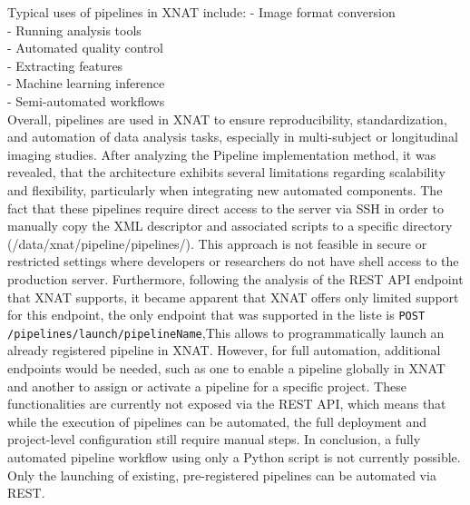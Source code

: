 Typical uses of pipelines in XNAT include:
- Image format conversion\\
- Running analysis tools\\
- Automated quality control\\
- Extracting features\\
- Machine learning inference\\
- Semi-automated workflows\\


Overall, pipelines are used in XNAT to ensure reproducibility, standardization, and automation of data
analysis tasks, especially in multi-subject or longitudinal imaging studies.
After analyzing the Pipeline implementation method, it was revealed, that the architecture exhibits several limitations regarding scalability and flexibility, particularly when integrating new automated components.
The fact that these pipelines require direct access to the server via SSH in order to manually copy the XML
descriptor and associated scripts to a specific directory (/data/xnat/pipeline/pipelines/). This approach is not
feasible in secure or restricted settings where developers or researchers do not have shell access to the production
server. Furthermore, following the analysis of the REST API endpoint that XNAT supports, it became apparent that XNAT offers only limited support for this endpoint, the only endpoint that was supported in the liste is \texttt{POST /pipelines/launch/{pipelineName}},This allows to programmatically launch an already registered pipeline in XNAT.  However, for full
automation, additional endpoints would be needed, such as one to enable a pipeline globally in XNAT and
another to assign or activate a pipeline for a specific project. These functionalities are currently not exposed via
the REST API, which means that while the execution of pipelines can be automated, the full deployment and
project-level configuration still require manual steps.
In conclusion, a fully automated pipeline workflow using only a Python script is not currently possible.
Only the launching of existing, pre-registered pipelines can be automated via REST.